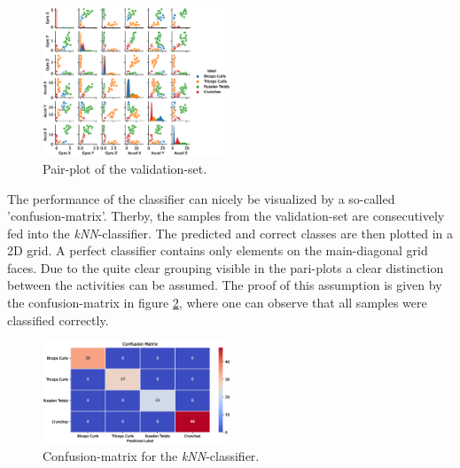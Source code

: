 \documentclass[journal]{IEEEtran}
\begin{document}
\begin{figure}[htbp]
    \centering
    \includegraphics[width=0.5\textwidth]{figures/kNN_pairplot_validation.eps}
    \caption{Pair-plot of the validation-set.}
    \label{fig:pairplot_kNN_validation}
\end{figure}

The performance of the classifier can nicely be visualized by a so-called
'confusion-matrix'. Therby, the samples from the validation-set are consecutively 
fed into the \textit{kNN}-classifier. The predicted and correct classes are then 
plotted in a 2D grid. A perfect classifier contains only elements on the main-diagonal
grid faces.\newline
Due to the quite clear grouping visible in the pari-plots a clear distinction
between the activities can be assumed. The proof of this assumption is given
by the confusion-matrix in figure \ref{fig:kNN_confusion}, where one can observe
that all samples were classified correctly.

\begin{figure}[htbp]
    \centering
    \includegraphics[width=0.5\textwidth]{figures/kNN_confusion_matrix.eps}
    \caption{Confusion-matrix for the \textit{kNN}-classifier.}
    \label{fig:kNN_confusion}
\end{figure}
\end{document}
